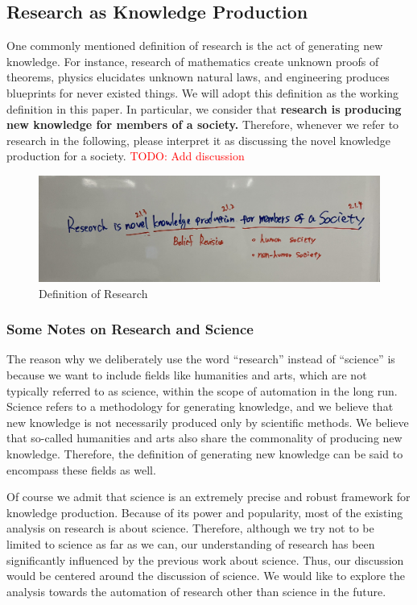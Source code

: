 \documentclass{book}
\begin{document}
\subsection{Research as Knowledge Production}

One commonly mentioned definition of research is the act of generating new knowledge. For instance, research of mathematics create unknown proofs of theorems, physics elucidates unknown natural laws, and engineering produces blueprints for never existed things. We will adopt this definition as the working definition in this paper. In particular, we consider that \textbf{research is producing new knowledge for members of a society.} Therefore, whenever we refer to research in the following, please interpret it as discussing the novel knowledge production for a society. \textcolor{red}{TODO: Add discussion}

\begin{figure}[htb]
    \centering
    \includegraphics[width=\linewidth]{figs/definition.jpg}
    \caption{Definition of Research}
    \label{fig:definition}
\end{figure}

\subsubsection{Some Notes on Research and Science}

The reason why we deliberately use the word ``research'' instead of ``science'' is because we want to include fields like humanities and arts, which are not typically referred to as science, within the scope of automation in the long run. Science refers to a methodology for generating knowledge, and we believe that new knowledge is not necessarily produced only by scientific methods. We believe that so-called humanities and arts also share the commonality of producing new knowledge. Therefore, the definition of generating new knowledge can be said to encompass these fields as well.

Of course we admit that science is an extremely precise and robust  framework for knowledge production. Because of its power and popularity, most of the existing analysis on research is about science. Therefore, although we try not to be limited to science as far as we can, our understanding of research has been significantly influenced by the previous work about science. Thus, our discussion would be centered around the discussion of science. We would like to explore the analysis towards the automation of research other than science in the future.
\end{document}
